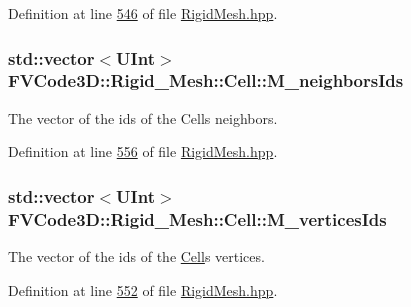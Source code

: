 Definition at line \hyperlink{RigidMesh_8hpp_source_l00546}{546} of file \hyperlink{RigidMesh_8hpp_source}{Rigid\+Mesh.\+hpp}.

\subsubsection[{\texorpdfstring{M\+\_\+neighbors\+Ids}{M_neighborsIds}}]{\setlength{\rightskip}{0pt plus 5cm}std\+::vector$<${\bf U\+Int}$>$ F\+V\+Code3\+D\+::\+Rigid\+\_\+\+Mesh\+::\+Cell\+::\+M\+\_\+neighbors\+Ids\hspace{0.3cm}{\ttfamily [protected]}}\hypertarget{classFVCode3D_1_1Rigid__Mesh_1_1Cell_a660774a8bb678b874639c9c1ea713bc6}{}\label{classFVCode3D_1_1Rigid__Mesh_1_1Cell_a660774a8bb678b874639c9c1ea713bc6}


The vector of the ids of the Cells neighbors. 



Definition at line \hyperlink{RigidMesh_8hpp_source_l00556}{556} of file \hyperlink{RigidMesh_8hpp_source}{Rigid\+Mesh.\+hpp}.

\subsubsection[{\texorpdfstring{M\+\_\+vertices\+Ids}{M_verticesIds}}]{\setlength{\rightskip}{0pt plus 5cm}std\+::vector$<${\bf U\+Int}$>$ F\+V\+Code3\+D\+::\+Rigid\+\_\+\+Mesh\+::\+Cell\+::\+M\+\_\+vertices\+Ids\hspace{0.3cm}{\ttfamily [protected]}}\hypertarget{classFVCode3D_1_1Rigid__Mesh_1_1Cell_a24b548a39f78eec19b66d6fe702409e4}{}\label{classFVCode3D_1_1Rigid__Mesh_1_1Cell_a24b548a39f78eec19b66d6fe702409e4}


The vector of the ids of the \hyperlink{classFVCode3D_1_1Rigid__Mesh_1_1Cell}{Cell}\textquotesingle{}s vertices. 



Definition at line \hyperlink{RigidMesh_8hpp_source_l00552}{552} of file \hyperlink{RigidMesh_8hpp_source}{Rigid\+Mesh.\+hpp}.

